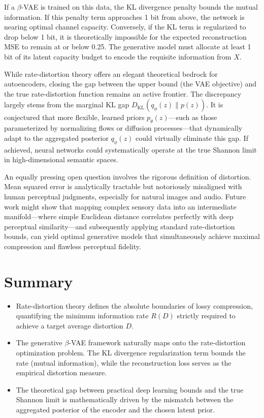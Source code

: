 If a $\beta$-VAE is trained on this data, the KL divergence penalty bounds the mutual information. If this penalty term approaches 1 bit from above, the network is nearing optimal channel capacity. Conversely, if the KL term is regularized to drop below 1 bit, it is theoretically impossible for the expected reconstruction MSE to remain at or below 0.25. The generative model must allocate at least 1 bit of its latent capacity budget to encode the requisite information from $X$.

\begin{horizon}
While rate-distortion theory offers an elegant theoretical bedrock for autoencoders, closing the gap between the upper bound (the VAE objective) and the true rate-distortion function remains an active frontier. The discrepancy largely stems from the marginal KL gap $D_{\text{KL}}(q_\phi(z) \parallel p(z))$. It is conjectured that more flexible, learned priors $p_\theta(z)$—such as those parameterized by normalizing flows or diffusion processes—that dynamically adapt to the aggregated posterior $q_\phi(z)$ could virtually eliminate this gap. If achieved, neural networks could systematically operate at the true Shannon limit in high-dimensional semantic spaces.

An equally pressing open question involves the rigorous definition of distortion. Mean squared error is analytically tractable but notoriously misaligned with human perceptual judgments, especially for natural images and audio. Future work might show that mapping complex sensory data into an intermediate manifold—where simple Euclidean distance correlates perfectly with deep perceptual similarity—and subsequently applying standard rate-distortion bounds, can yield optimal generative models that simultaneously achieve maximal compression and flawless perceptual fidelity.
\end{horizon}

\section{Summary}
\begin{itemize}
    \item Rate-distortion theory defines the absolute boundaries of lossy compression, quantifying the minimum information rate $R(D)$ strictly required to achieve a target average distortion $D$.
    \item The generative $\beta$-VAE framework naturally maps onto the rate-distortion optimization problem. The KL divergence regularization term bounds the rate (mutual information), while the reconstruction loss serves as the empirical distortion measure.
    \item The theoretical gap between practical deep learning bounds and the true Shannon limit is mathematically driven by the mismatch between the aggregated posterior of the encoder and the chosen latent prior.
\end{itemize}

